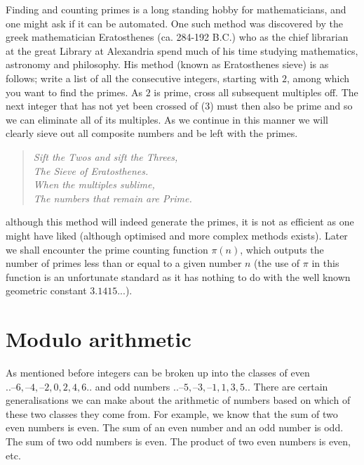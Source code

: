 Finding and counting primes is a long standing hobby for mathematicians, and one might ask if it can be automated. One such method was discovered by the greek mathematician Eratosthenes (ca. 284-192 B.C.) who as the chief librarian at the great Library at Alexandria spend much of his time studying mathematics, astronomy and philosophy. His method (known as Eratosthenes sieve) is as follows; write a list of all the consecutive integers, starting with $2$, among which you want to find the primes. As $2$ is prime, cross all subsequent multiples off. The next integer that has not yet been crossed of (3) must then also be prime and so we can eliminate all of its multiples. As we continue in this manner we will clearly sieve out all composite numbers and be left with the primes.
\begin{verse}\emph{
Sift the Twos and sift the Threes,\\
The Sieve of Eratosthenes.\\
When the multiples sublime,\\
The numbers that remain are Prime.}
\end{verse}
although this method will indeed generate the primes, it is not as efficient as one might have liked (although optimised and more complex methods exists). Later we shall encounter the prime counting function $\pi(n)$, which outputs the number of primes less than or equal to a given number $n$ (the use of $\pi$ in this function is an unfortunate standard as it has nothing to do with the well known geometric constant $3.1415...$).


\section{Modulo arithmetic}
As mentioned before integers can be broken up into the classes of even $..–6, –4, –2, 0, 2, 4, 6..$ and odd numbers $..–5, –3, –1, 1, 3, 5..$ There are certain generalisations we can make about the arithmetic of numbers based on which of these two classes they come from. For example, we know that the sum of two even numbers is even. The sum of an even number and an odd number is odd. The sum of two odd numbers is even. The product of two even numbers is even, etc.

